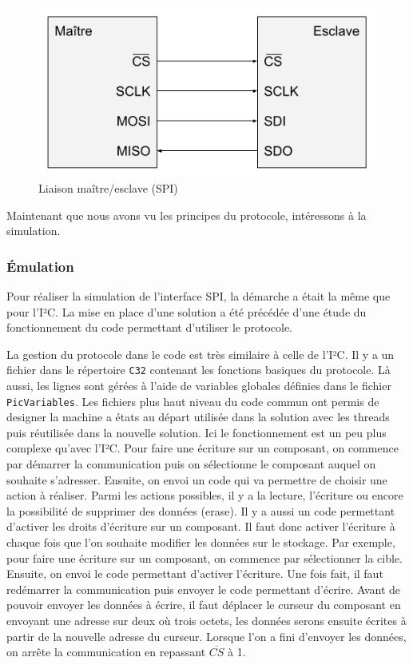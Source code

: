 \documentclass[a4paper]{article}
\begin{document}
\begin{figure}[h!]
  \begin{center}
    \includegraphics[scale=0.6]{./img/schema-spi.png}
    \caption{Liaison maître/esclave (SPI)}
    \label{fig:schemaspi}
  \end{center}
\end{figure}

Maintenant que nous avons vu les principes du protocole, intéressons à la
simulation.

\subsubsection*{Émulation}

Pour réaliser la simulation de l'interface SPI, la démarche a était la même que
pour l'I²C. La mise en place d'une solution a été précédée d'une étude du
fonctionnement du code permettant d'utiliser le protocole.

La gestion du protocole dans le code est très similaire à celle de l'I²C. Il y a
un fichier dans le répertoire \verb|C32| contenant les fonctions basiques
du protocole. Là aussi, les lignes sont gérées à l'aide de variables globales
définies dans le fichier \verb|PicVariables|. Les fichiers plus haut niveau
du code commun ont permis de designer la machine a états au départ utilisée dans
la solution avec les threads puis réutilisée dans la nouvelle solution. Ici le
fonctionnement est un peu plus complexe qu'avec l'I²C. Pour faire une écriture
sur un composant, on commence par démarrer la communication puis on sélectionne
le composant auquel on souhaite s'adresser. Ensuite, on envoi un code qui va
permettre de choisir une action à réaliser. Parmi les actions possibles, il y a
la lecture, l'écriture ou encore la possibilité de supprimer des données
(erase). Il y a aussi un code permettant d'activer les droits d'écriture sur un
composant. Il faut donc activer l'écriture à chaque fois que l'on souhaite
modifier les données sur le stockage. Par exemple, pour faire une écriture sur
un composant, on commence par sélectionner la cible. Ensuite, on envoi le code
permettant d'activer l'écriture. Une fois fait, il faut redémarrer la
communication puis envoyer le code permettant d'écrire. Avant de pouvoir envoyer
les données à écrire, il faut déplacer le curseur du composant en envoyant une
adresse sur deux où trois octets, les données serons ensuite écrites à partir de
la nouvelle adresse du curseur. Lorsque l'on a fini d'envoyer les données, on
arrête la communication en repassant $\overline{CS}$ à 1.
\end{document}
